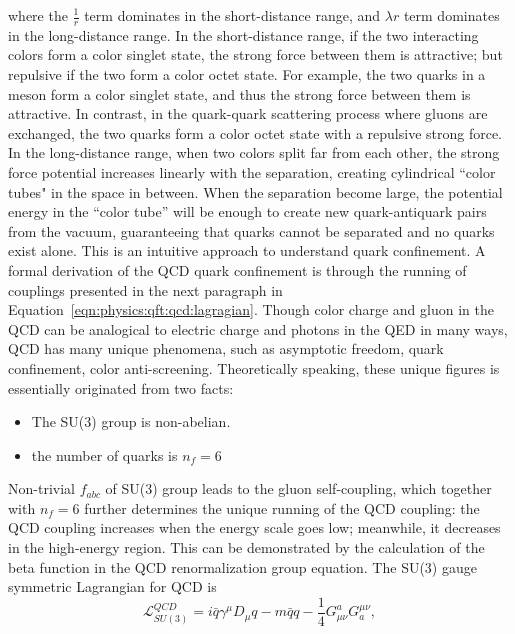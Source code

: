 \noindent where  the $\frac{1}{r}$ term dominates in the short-distance range, and $\lambda r$ term dominates in the long-distance range. In the short-distance range, if the two interacting colors form a color singlet state, the strong force between them is attractive; but repulsive if the two form a color octet state. For example, the two quarks in a meson form a color singlet state, and thus the strong force between them is attractive. In contrast, in the quark-quark scattering process where gluons are exchanged, the two quarks form a color octet state with a repulsive strong force. In the long-distance range, when two colors split far from each other, the strong force potential increases linearly with the separation, creating cylindrical ``color tubes" in the space in between. When the separation become large, the potential energy in the ``color tube'' will be enough to create new quark-antiquark pairs from the vacuum, guaranteeing that quarks cannot be separated and no quarks exist alone. This is an intuitive approach to understand quark confinement. A formal derivation of the QCD quark confinement is through the running of couplings presented in the next paragraph in Equation~\ref{eqn:physics:qft:qcd:lagragian}. Though color charge and gluon in the QCD can be analogical to electric charge and photons in the QED  in many ways, QCD has many unique phenomena, such as asymptotic freedom, quark confinement, color anti-screening. Theoretically speaking, these unique figures is essentially originated from two facts:
\begin{itemize}
\item The SU(3) group is non-abelian.
\item the number of quarks is $n_f=6$ 
\end{itemize}

\noindent Non-trivial $f_{abc}$ of SU(3) group leads to the gluon self-coupling, which together with $n_f=6$ further determines the unique running of the QCD coupling: the QCD coupling increases when the energy scale goes low; meanwhile, it decreases in the high-energy region.  This can be demonstrated by the calculation of the beta function in the QCD renormalization group equation.  The SU(3) gauge symmetric Lagrangian for QCD is
\begin{equation}
    \mathcal{L}^{QCD}_{SU(3)} = i\bar{q}\gamma^\mu D_\mu q  - m\bar{q} q - \frac{1}{4}G^a_{\mu\nu}G^{\mu\nu}_a, 
    \label{eqn:physics:qft:qcd:lagragian}
\end{equation}


